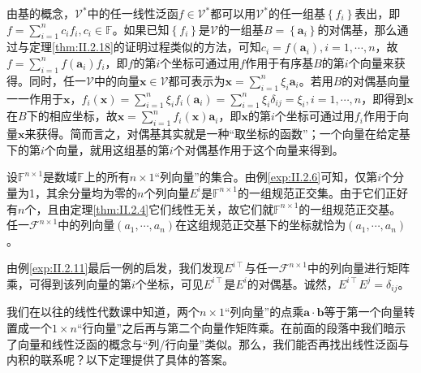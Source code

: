 \documentclass[main.tex]{subfiles}
\begin{document}
由基的概念，$\mathcal{V}^*$中的任一线性泛函$f\in\mathcal{V}^*$都可以用$\mathcal{V}^*$的任一组基$\left\{f_i\right\}$表出，即$f=\sum_{i=1}^nc_if_i,c_i\in\mathbb{F}$。如果已知$\left\{f_i\right\}$是$\mathcal{V}$的一组基$B=\left\{\mathbf{a}_i\right\}$的对偶基，那么通过与定理\ref{thm:II.2.18}的证明过程类似的方法，可知$c_i=f\left(\mathbf{a}_i\right),i=1,\cdots,n$，故$f=\sum_{i=1}^nf\left(\mathbf{a}_i\right)f_i$，即$f$的第$i$个坐标可通过用$f$作用于有序基$B$的第$i$个向量来获得。同时，任一$\mathcal{V}$中的向量$\mathbf{x}\in\mathcal{V}$都可表示为$\mathbf{x}=\sum_{i=1}^n\xi_i\mathbf{a}_i$。若用$B$的对偶基向量一一作用于$\mathbf{x}$，$f_i\left(\mathbf{x}\right)=\sum_{i=1}^n\xi_if_i\left(\mathbf{a}_i\right)=\sum_{i=1}^n\xi_i\delta_{ij}=\xi_i,i=1,\cdots,n$，即得到$\mathbf{x}$在$B$下的相应坐标，故$\mathbf{x}=\sum_{i=1}^nf_i\left(\mathbf{x}\right)\mathbf{a}_i$，即$\mathbf{x}$的第$i$个坐标可通过用$f_i$作用于向量$\mathbf{x}$来获得。简而言之，对偶基其实就是一种“取坐标的函数”；一个向量在给定基下的第$i$个向量，就用这组基的第$i$个对偶基作用于这个向量来得到。

\begin{example}
    设$\mathbb{F}^{n\times 1}$是数域$\mathbb{F}$上的所有$n\times 1 $“列向量”的集合。由例\ref{exp:II.2.6}可知，仅第$i$个分量为1，其余分量均为零的$n$个列向量$E^i$是$\mathbb{F}^{n\times 1}$的一组规范正交集。由于它们正好有$n$个，且由定理\ref{thm:II.2.4}它们线性无关，故它们就$\mathbb{F}^{n\times 1}$的一组规范正交基。    任一$\mathcal{F}^{n\times 1}$中的列向量$\left(a_1,\cdots,a_n\right)$在这组规范正交基下的坐标就恰为$\left(a_1,\cdots,a_n\right)$。

    由例\ref{exp:II.2.11}最后一例的启发，我们发现$E^{i\intercal}$与任一$\mathcal{F}^{n\times 1}$中的列向量进行矩阵乘，可得到该列向量的第$i$个坐标，可见$E^{i\intercal}$是$E^i$的对偶基。诚然，$E^{i\intercal}E^j=\delta_{ij}$。
\end{example}

我们在以往的线性代数课中知道，两个$n\times 1$“列向量”的点乘$\mathbf{a}\cdot\mathbf{b}$等于第一个向量转置成一个$1\times n$“行向量”之后再与第二个向量作矩阵乘。在前面的段落中我们暗示了向量和线性泛函的概念与“列/行向量”类似。那么，我们能否再找出线性泛函与内积的联系呢？以下定理提供了具体的答案。
\end{document}
